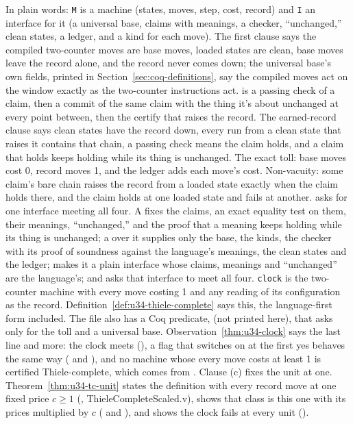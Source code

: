 In plain words: \texttt{M} is a machine (states, moves, step, cost, record) and \texttt{I} an
interface for it (a universal base, claims with meanings, a checker, ``unchanged,'' clean states,
a ledger, and a kind for each move). The first clause says the compiled two-counter moves are
base moves, loaded states are clean, base moves leave the record alone, and the record never comes
down; the universal base's own fields, printed in Section~\ref{sec:coq-definitions}, say the compiled moves act on the window
exactly as the two-counter instructions act.  is a passing check of a claim,
then a commit of the same claim with the thing it's about unchanged at every point between, then
the certify that raises the record. The earned-record clause says clean states have the record
down, every run from a clean state that raises it contains that chain, a passing check means the
claim holds, and a claim that holds keeps holding while its thing is unchanged. The exact toll:
base moves cost 0, record moves 1, and the ledger adds each move's cost. Non-vacuity: some claim's
bare chain raises the record from a loaded state exactly when the claim holds there, and the claim
holds at one loaded state and fails at another.  asks for one interface
meeting all four. A  fixes the claims, an exact equality test on them, their
meanings, ``unchanged,'' and the proof that a meaning keeps holding while its thing is unchanged;
a  over it supplies only the base, the kinds, the checker with its proof of
soundness against the language's meanings, the clean states and the ledger;  makes
it a plain interface whose claims, meanings and ``unchanged'' are the language's; and
 asks that interface to meet all four.
\texttt{clock} is the two-counter machine with every move costing 1 and any
reading of its configuration as the record. Definition~\ref{def:u34-thiele-complete} says
this, the language-first form included. The file also has a Coq predicate,
 (not printed here), that asks only for the toll and a universal
base. Observation~\ref{thm:u34-clock} says the last line and more: the clock meets
 (), a flag that switches on at the first yes
behaves the same way ( and
), and no machine whose every move costs at least 1 is
certified Thiele-complete, which comes from . Clause (c) fixes the unit at
one. Theorem~\ref{thm:u34-tc-unit} states the definition with every record move at one fixed price
$c \ge 1$ (, ThieleCompleteScaled.v), shows that class is this one with
its prices multiplied by $c$ ( and ), and shows the
clock fails at every unit ().

